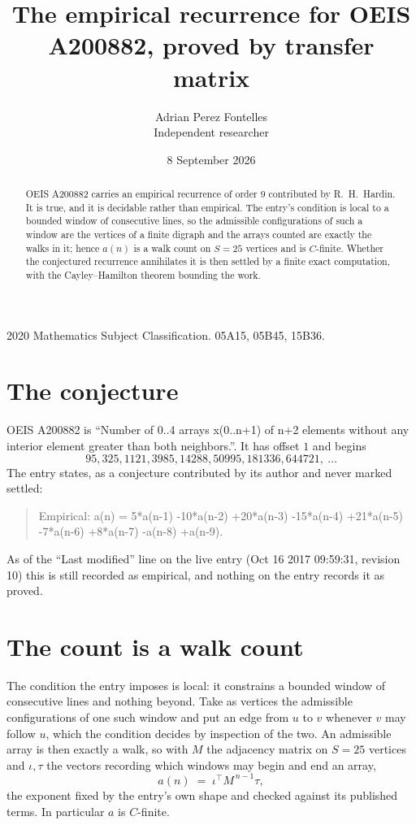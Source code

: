 \documentclass[11pt,a4paper]{article}
\title{The empirical recurrence for OEIS A200882, proved by transfer matrix}
\author{Adrian Perez Fontelles\\ \small Independent researcher}
\date{8 September 2026}
\theoremstyle{plain}
\theoremstyle{definition}
\begin{document}
\maketitle

\begin{abstract}
OEIS A200882 carries an empirical recurrence of order $9$ contributed by R.~H.~Hardin. It is
true, and it is decidable rather than empirical. The entry's condition is local to a bounded window of consecutive lines, so
the admissible configurations of such a window are the vertices of a finite digraph and the
arrays counted are exactly the walks in it; hence $a(n)$ is a walk count on $S=25$ vertices
and is $C$-finite. Whether the conjectured recurrence annihilates it is then settled by a
finite exact computation, with the Cayley--Hamilton theorem bounding the work.
\end{abstract}

\noindent\small 2020 Mathematics Subject Classification. 05A15, 05B45, 15B36.\normalsize

\section{The conjecture}

OEIS A200882 is ``Number of 0..4 arrays x(0..n+1) of n+2 elements without any interior element greater than both neighbors.''. It has offset $1$ and begins
\[
95, 325, 1121, 3985, 14288, 50995, 181336, 644721,\ \dots
\]
The entry states, as a conjecture contributed by its author and never marked settled:
\begin{quote}
Empirical: a(n) = 5*a(n-1) -10*a(n-2) +20*a(n-3) -15*a(n-4) +21*a(n-5) -7*a(n-6) +8*a(n-7) -a(n-8) +a(n-9).
\end{quote}
As of the ``Last modified'' line on the live entry (Oct 16 2017 09:59:31, revision 10) this is still
recorded as empirical, and nothing on the entry records it as proved.

\section{The count is a walk count}

The condition the entry imposes is local: it constrains a bounded window of consecutive lines and nothing beyond. Take as
vertices the admissible configurations of one such window and put an edge from $u$ to $v$
whenever $v$ may follow $u$, which the condition decides by inspection of the two. An
admissible array is then exactly a walk, so with $M$ the adjacency matrix on $S=25$ vertices
and $\iota,\tau$ the vectors recording which windows may begin and end an array,
\[
a(n)\;=\;\iota^{\!\top}M^{\,n-1}\tau ,
\]
the exponent fixed by the entry's own shape and checked against its published terms. In
particular $a$ is $C$-finite.
\end{document}
